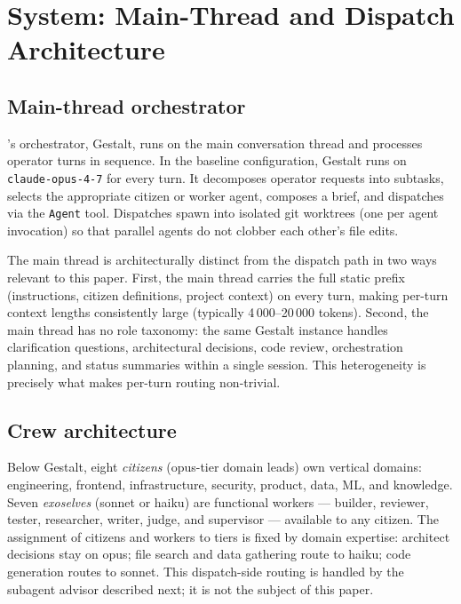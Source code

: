 \section{System: \blackrim Main-Thread and Dispatch Architecture}
\label{sec:system}

\subsection{Main-thread orchestrator}

\blackrim's orchestrator, Gestalt, runs on the main conversation
thread and processes operator turns in sequence.  In the baseline
configuration, Gestalt runs on \texttt{claude-opus-4-7} for every
turn.  It decomposes operator requests into subtasks, selects the
appropriate citizen or worker agent, composes a brief, and dispatches
via the \texttt{Agent} tool.  Dispatches spawn into isolated
git worktrees (one per agent invocation) so that parallel agents do
not clobber each other's file edits.

The main thread is architecturally distinct from the dispatch path in
two ways relevant to this paper.  First, the main thread carries the
full static prefix (\claudemd instructions, citizen definitions,
project context) on every turn, making per-turn context lengths
consistently large (typically 4\,000–20\,000 tokens).  Second, the
main thread has no role taxonomy: the same Gestalt instance handles
clarification questions, architectural decisions, code review,
orchestration planning, and status summaries within a single session.
This heterogeneity is precisely what makes per-turn routing
non-trivial.

\subsection{Crew architecture}

Below Gestalt, eight \emph{citizens} (opus-tier domain leads) own
vertical domains: engineering, frontend, infrastructure, security,
product, data, ML, and knowledge.  Seven \emph{exoselves} (sonnet or
haiku) are functional workers — builder, reviewer, tester, researcher,
writer, judge, and supervisor — available to any citizen.  The
assignment of citizens and workers to tiers is fixed by domain
expertise: architect decisions stay on opus; file search and data
gathering route to haiku; code generation routes to sonnet.  This
dispatch-side routing is handled by the subagent advisor described
next; it is not the subject of this paper.

